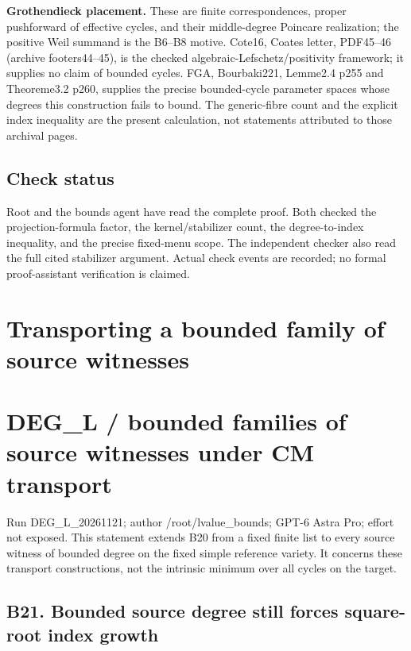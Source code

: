 \documentclass[11pt,a4paper]{article}
\providecommand{\tightlist}{\setlength{\itemsep}{0pt}\setlength{\parskip}{0pt}}
\theoremstyle{definition}
\begin{document}
\textbf{Grothendieck placement.} These are finite correspondences,
proper pushforward of effective cycles, and their middle-degree Poincare
realization; the positive Weil summand is the B6--B8 motive. Cote16,
Coates letter, PDF45--46 (archive footers44--45), is the checked
algebraic-Lefschetz/positivity framework; it supplies no claim of
bounded cycles. FGA, Bourbaki221, Lemme2.4 p255 and Theoreme3.2 p260,
supplies the precise bounded-cycle parameter spaces whose degrees this
construction fails to bound. The generic-fibre count and the explicit
index inequality are the present calculation, not statements attributed
to those archival pages.

\subsection{Check status}\label{fixed-witness-transport-check-status}

Root and the bounds agent have read the complete proof. Both checked the
projection-formula factor, the kernel/stabilizer count, the
degree-to-index inequality, and the precise fixed-menu scope. The
independent checker also read the full cited stabilizer argument. Actual
check events are recorded; no formal proof-assistant verification is
claimed.

\section{Transporting a bounded family of source witnesses}

\providecommand{\tightlist}{\setlength{\itemsep}{0pt}\setlength{\parskip}{0pt}}
\section{DEG\_L / bounded families of source witnesses under CM transport}\label{deg_l-bounded-families-of-source-witnesses-under-cm-transport}

Run DEG\_L\_20261121; author /root/lvalue\_bounds; GPT-6 Astra Pro; effort not exposed. This statement extends B20 from a fixed finite list to every source witness of bounded degree on the fixed simple reference variety. It concerns these transport constructions, not the intrinsic minimum over all cycles on the target.

\subsection{B21. Bounded source degree still forces square-root index growth}\label{b21.-bounded-source-degree-still-forces-square-root-index-growth}
\end{document}
